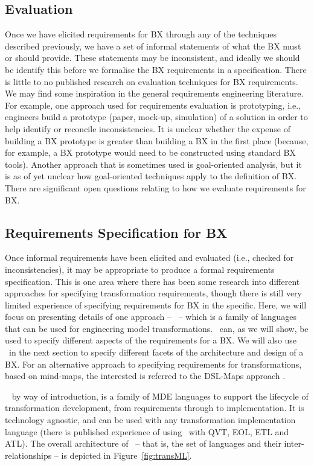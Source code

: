 \subsection{Evaluation}
Once we have elicited requirements for BX through any of the techniques described previously, we have a set of informal statements of what the BX must or should provide. These statements may be inconsistent, and ideally we should be identify this before we formalise the BX requirements in a specification. There is little to no published research on evaluation techniques for BX requirements. We may find some inspiration in the general requirements engineering literature. For example, one approach used for requirements evaluation is prototyping, i.e., engineers build a prototype (paper, mock-up, simulation) of a solution in order to help identify or reconcile inconsistencies. It is unclear whether the expense of building a BX prototype is greater than building a BX in the first place (because, for example, a BX prototype would need to be constructed using standard BX tools). Another approach that is sometimes used is goal-oriented analysis, but it is as of yet unclear  how goal-oriented techniques apply to the definition of BX. There are significant open questions relating to how we evaluate requirements for BX.

\subsection{Requirements Specification for BX}
Once informal requirements have been elicited and evaluated (i.e., checked for inconsistencies), it may be appropriate to produce a formal requirements specification. This is one area where there has been some research into different approaches for specifying transformation requirements, though there is still very limited experience of specifying requirements for BX in the specific. Here, we will focus on presenting details of one approach -- \transml\ -- which is a family of languages that can be used for engineering model transformations. \transml\ can, as we will show, be used to specify different aspects of the requirements for a BX. We will also use \transml\ in the next section to specify different facets of the architecture and design of a BX. For an alternative approach to specifying requirements for transformations, based on mind-maps, the interested is referred to the DSL-Maps approach \cite{PescadorL16}.

\transml\ \cite{GuerraLKPS13} by way of introduction, is a family of MDE languages to support the lifecycle of transformation development, from requirements through to implementation. It is technology agnostic, and can be used with any transformation implementation language (there is published experience of using \transml\ with QVT, EOL, ETL and ATL). The overall architecture of \transml\ -- that is, the set of languages and their inter-relationships -- is depicted in Figure~\ref{fig:transML}.

